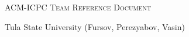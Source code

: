 \documentclass[a4paper, 10pt]{extarticle}
\begin{document}
\thispagestyle{fancy}

\begin{center}
	\Huge\textsc{ACM-ICPC Team Reference Document}

	\huge Tula State University (Fursov, Perezyabov, Vasin)

	\vspace{0.50cm}
\end{center}

\begin{multicols*}{2}
    \tableofcontents

    \setcounter{page}{1}
    
\end{multicols*}



%
%	
\end{document}
